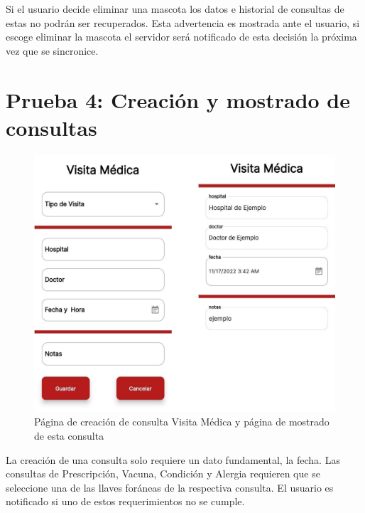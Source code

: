 Si el usuario decide eliminar una mascota los datos e historial de consultas de estas no podrán ser recuperados. Esta advertencia es mostrada ante el usuario, si escoge eliminar la mascota el servidor será notificado de esta decisión la próxima vez que se sincronice.


\newpage

\section{Prueba 4: Creación y mostrado de consultas}


\begin{figure}[h!]
\begin{center}
\includegraphics[scale=0.15]{Graphics/images/hcvet/medvisit.jpg}
\caption{Página de creación de consulta Visita Médica y página de mostrado de esta consulta}
\label{fig:bac}

\end{center}
\end{figure}

La creación de una consulta solo requiere un dato fundamental, la fecha. Las consultas de Prescripción, Vacuna, Condición y Alergia requieren que se seleccione una de las llaves foráneas de la respectiva consulta. El usuario es notificado si uno de estos requerimientos no se cumple.

